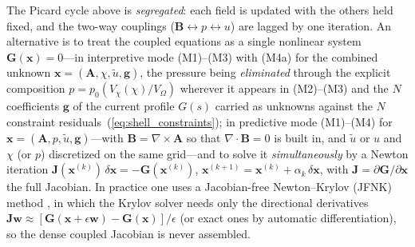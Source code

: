 \documentclass[english]{article}
\newcommand{\bB}{\mathbf{B}}
\begin{document}
The Picard cycle above is \emph{segregated}: each field is updated with the others held fixed, and
the two-way couplings ($\bB\!\leftrightarrow\!p\!\leftrightarrow\!u$) are lagged by one iteration.
An alternative is to treat the coupled equations as a single nonlinear system
$\mathbf{G}(\mathbf{x})=0$---in interpretive mode (M1)--(M3) with (M4a) for the combined unknown
$\mathbf{x}=(\mathbf{A},\chi,\tilde u,\mathbf g)$, the pressure being \emph{eliminated}
through the explicit composition $p=p_0(V_\chi(\chi)/V_\Omega)$ wherever it appears in (M2)--(M3) and the
$N$ coefficients $\mathbf g$ of the current profile $G(s)$ carried as unknowns against the $N$
constraint residuals~(\ref{eq:shell_constraints}); in predictive mode
(M1)--(M4) for $\mathbf{x}=(\mathbf{A},p,\tilde u,\mathbf g)$---with $\bB=\nabla\times\mathbf{A}$ so that
$\nabla\cdot\bB=0$ is built in, and $\tilde u$ or $u$ and $\chi$ (or $p$) discretized on the same
grid---and to solve it \emph{simultaneously} by a Newton iteration
$\mathbf{J}(\mathbf{x}^{(k)})\,\delta\mathbf{x}=-\mathbf{G}(\mathbf{x}^{(k)})$,
$\mathbf{x}^{(k+1)}=\mathbf{x}^{(k)}+\alpha_k\,\delta\mathbf{x}$, with
$\mathbf{J}=\partial\mathbf{G}/\partial\mathbf{x}$ the full Jacobian. In practice one uses a
Jacobian-free Newton--Krylov (JFNK) method \cite{knoll2004}, in which the Krylov solver needs only
the directional derivatives $\mathbf{J}\mathbf{w}\approx[\mathbf{G}(\mathbf{x}+\epsilon\mathbf{w})
-\mathbf{G}(\mathbf{x})]/\epsilon$ (or exact ones by automatic differentiation), so the dense
coupled Jacobian is never assembled.
\end{document}
